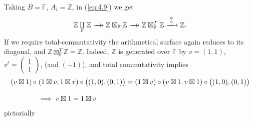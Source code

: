 \documentclass[leqno]{article}
\newcommand{\xtworightarrow}[2][]{%
				  \xrightarrow[#1]{#2}\mathrel{\mkern-14mu}\rightarrow
	}
\newcommand{\F}{\mathbb{F}}
\newcommand{\Z}{\mathbb{Z}}
\newcommand{\smallcoprod}[1]{  %
				\underset{#1}{\amalg}
}
\numberwithin{equation}{section}
\begin{document}
Taking $B=\F$,
$A_{i}=\Z$, in (\ref{eq:4.9}) we get
\[
  \Z \smallcoprod{\F}\Z\xtworightarrow{\;\;\;}
  \Z\boxtimes_{\F}\Z\xtworightarrow{\;\;\;}\Z\boxtimes_{\F}^{T}\Z
  \xrightarrow{\;\overset{\nabla}{\sim}\;}\Z.
\]
If we require total-commutativity the arithmetical surface again reduces to its
diagonal, and $\Z\boxtimes_{\F}^T\Z=\Z$. Indeed, $\Z$ is generated over
$\F$ by $v=(1,1)$, $v^{t}= \begin{pmatrix}1\\ 1
\end{pmatrix} $, (and $(-1)$), and total commutativity implies 
\begin{equation}
        \begin{array}[H]{ll}
          (v\boxtimes 1)\,\circ \hspace{-2.5mm}&(1\boxtimes v, 1\boxtimes v)
          \circ \big((1,0),(0,1) \big) =
          (1\boxtimes v)\circ (v\boxtimes 1 , v\boxtimes 1 )\circ \big( (1,0),(0,1)\big) \\\\
          &\implies  v\boxtimes 1 = 1 \boxtimes v
	\end{array}
	\label{eq:4.12}
\end{equation}
pictorially
\end{document}
